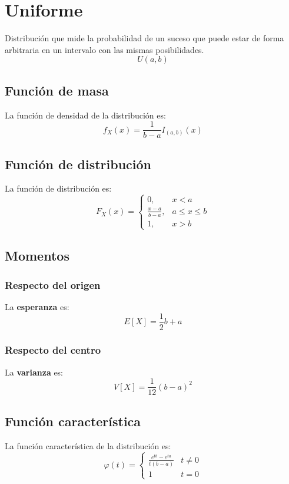 \section{Uniforme}
\label{sec:uniforme}
Distribución que mide la probabilidad de un suceso que puede estar de forma arbitraria en un intervalo con las mismas posibilidades.
\[
\boxed{U\left( a, b \right)}
\]

\subsection{Función de masa}
La función de densidad de la distribución es:
\[
f_X \left( x \right) = \frac{1}{b-a} I_{\left( a, b \right)}\left( x \right)
\]

\subsection{Función de distribución}
La función de distribución es:
\[
F_X\left( x \right) = \begin{cases}
    0, &x < a\\ 
    \frac{x-a}{b-a}, & a \le x \le b\\ 
    1, & x > b
\end{cases}
\]

\subsection{Momentos}

\subsubsection*{Respecto del origen}
La \textbf{esperanza} es: 
\[
    E\left[ X \right] = \frac{1}{2} b+a
\]
\subsubsection*{Respecto del centro}
La \textbf{varianza} es:
\[
    V\left[ X \right] = \frac{1}{12}\left( b - a \right)^2
\]

\subsection{Función característica}
La función característica de la distribución es:
\[
\varphi\left( t \right) = \begin{cases}
    \frac{e^{tb} - e^{ta}}{t\left( b - a \right)}&t \neq 0\\
    1 &t = 0
\end{cases} 
\]

